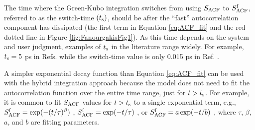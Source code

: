 \documentclass[9pt,bestpractices]{livecoms}
\begin{document}
The time where the Green-Kubo integration switches from using $S_{\rm ACF}$ to $S^{\rm f}_{\rm ACF}$, referred to as the switch-time $(t_{\rm s})$, should be after the ``fast'' autocorrelation component has dissipated (the first term in Equation \ref{eq:ACF_fit} and the red dotted line in Figure \ref{fig:FanourgakisFig1}). As this time depends on the system and user judgment, examples of $t_{\rm s}$ in the literature range widely. For example, $t_{\rm s} = 5$ ps in Refs. \cite{vanderSpoel1998,Shirts2013} while the switch-time value is only 0.015 ps in Ref. \cite{Fernandez2005}.  

A simpler exponential decay function than Equation \ref{eq:ACF_fit} can be used with the hybrid integration approach because the model does not need to fit the autocorrelation function over the entire time range, just for $t > t_{\rm s}$. For example, it is common to fit $S_{\rm ACF}$ values for $t > t_{\rm s}$ to a single exponential term, e.g., $S^{\rm f}_{\rm ACF} = \exp(-(t/\tau)^\beta)$ \cite{vanderSpoel1998}, $S^{\rm f}_{\rm ACF} = \exp(-t/\tau)$ \cite{Shirts2013}, or $S^{\rm f}_{\rm ACF} = a \exp(-t/b)$ \cite{Fernandez2005}, where $\tau$, $\beta$, $a$, and $b$ are fitting parameters. 



\end{document}
